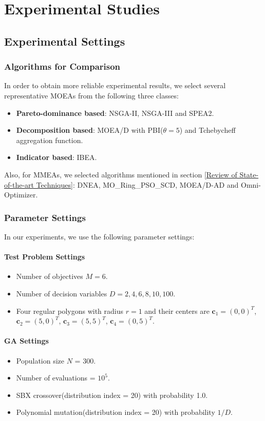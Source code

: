 \documentclass[conference]{IEEEtran}
\begin{document}
\section{Experimental Studies}
\label{Experimental Studies}
\subsection{Experimental Settings}
\label{Experimental Settings}
\subsubsection{Algorithms for Comparison}
In order to obtain more reliable experimental results, we select several representative MOEAs from the following three classes:
\begin{itemize}
    \item \textbf{Pareto-dominance based}: NSGA-II\cite{NSGA-II}, NSGA-III\cite{NSGA-III} and SPEA2\cite{SPEA2}.
    \item \textbf{Decomposition based}: MOEA/D \cite{MOEA/D} with PBI($\theta=5$) and Tchebycheff aggregation function.
    \item \textbf{Indicator based}: IBEA\cite{IBEA}.
\end{itemize}

Also, for MMEAs, we selected algorithms mentioned in section \ref{Review of State-of-the-art Techniques}: DNEA, MO\_Ring\_PSO\_SCD, MOEA/D-AD and Omni-Optimizer.
\subsubsection{Parameter Settings}
In our experiments, we use the following parameter settings: 
\paragraph{Test Problem Settings}
\begin{itemize}
     \item Number of objectives $M=6$.
    \item Number of decision variables $D=2, 4, 6, 8, 10, 100$.
    \item Four regular polygons with radius $r=1$ and their centers are $\boldsymbol{c}_1=(0, 0)^T$, $\boldsymbol{c}_2=(5, 0)^T$, $\boldsymbol{c}_3=(5, 5)^T$, $\boldsymbol{c}_4=(0, 5)^T$. 
\end{itemize}
\paragraph{GA Settings}
\begin{itemize}
    \item Population size $N$ = 300.
    \item Number of evaluations = $10^5$.
    \item SBX crossover(distribution index = 20) with probability 1.0.
    \item Polynomial mutation(distribution index = 20) with probability $1/D$.
\end{itemize}
\end{document}
